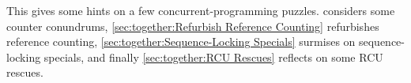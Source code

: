 
%


This 
gives some hints on a few concurrent-programming puzzles.
considers some counter conundrums,
\cref{sec:together:Refurbish Reference Counting}
refurbishes reference counting,
\cref{sec:together:Sequence-Locking Specials}
surmises on sequence-locking specials,
and finally
\cref{sec:together:RCU Rescues}
reflects on some RCU rescues.







